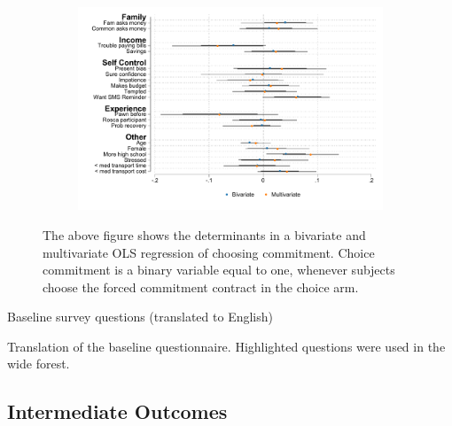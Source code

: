 \begin{appendix}
\begin{figure}[H]
    \caption{Determinants of choice.}
    \begin{center}
    \begin{subfigure}{0.65\textwidth}
        \centering
        \includegraphics[width=\textwidth]{Figuras/determinants_choose_commitment.pdf}
    \end{subfigure}
    \end{center}
\footnotesize{The above figure shows the determinants in a bivariate and multivariate OLS regression of choosing commitment. Choice commitment is a binary variable equal to one, whenever subjects choose the forced commitment contract in the choice arm. }
    \label{determinants_choose}
\end{figure}

\newpage

\begin{table}[!h]
\caption{Baseline survey questions (translated to English)}
\label{baseline_survey}
\begin{center}
\scriptsize{}
\end{center}
\scriptsize{
Translation of the baseline questionnaire. Highlighted questions were used in the wide forest.}
\end{table}

\newpage

\begin{landscape}
\subsection{Intermediate Outcomes}
  

\end{landscape}
\end{appendix}
